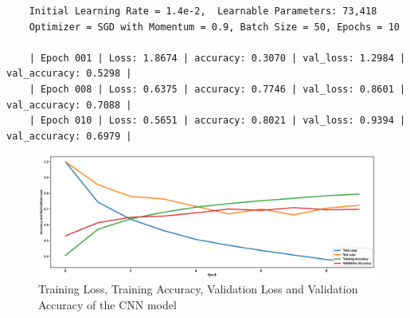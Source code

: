 \documentclass[a4paper,11pt]{article}%
\begin{document}
\begin{verbatim}
	Initial Learning Rate = 1.4e-2,  Learnable Parameters: 73,418
	Optimizer = SGD with Momentum = 0.9, Batch Size = 50, Epochs = 10
	
	| Epoch 001 | Loss: 1.8674 | accuracy: 0.3070 | val_loss: 1.2984 | val_accuracy: 0.5298 |
	| Epoch 008 | Loss: 0.6375 | accuracy: 0.7746 | val_loss: 0.8601 | val_accuracy: 0.7088 |
	| Epoch 010 | Loss: 0.5651 | accuracy: 0.8021 | val_loss: 0.9394 | val_accuracy: 0.6979 |
\end{verbatim}


\begin{figure}[!h]
	\centering
	\includegraphics[scale=0.3]{figures/part4plots}
	\caption{\footnotesize Training Loss, Training Accuracy, Validation Loss and Validation Accuracy of the CNN model}
\end{figure}
\end{document}
